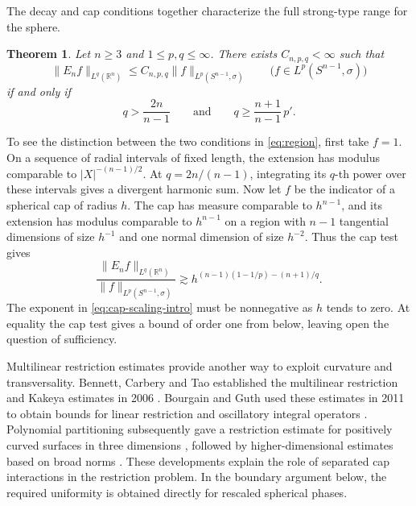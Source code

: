 \documentclass[11pt]{article}
\numberwithin{equation}{section}
\newtheorem{theorem}{Theorem}[section]
\newcommand{\R}{\mathbb{R}}
\newcommand{\norm}[1]{\lVert #1\rVert}
\newcommand{\abs}[1]{\lvert #1\rvert}
\begin{document}
The decay and cap conditions together characterize the full strong-type
range for the sphere.

\begin{theorem}\label{thm:main}
Let \(n\ge3\) and \(1\le p,q\le\infty\). There exists
\(C_{n,p,q}<\infty\) such that
\[
 \norm{E_n f}_{L^q(\R^n)}
 \le C_{n,p,q}\norm{f}_{L^p(S^{n-1},\sigma)}
 \qquad \bigl(f\in L^p(S^{n-1},\sigma)\bigr)
\]
if and only if
\begin{equation}\label{eq:region}
 q>\frac{2n}{n-1}
 \qquad\text{and}\qquad
 q\geq\frac{n+1}{n-1}\,p'.
\end{equation}
\end{theorem}

To see the distinction between the two conditions in
\eqref{eq:region}, first take \(f=1\). On a sequence of radial intervals of fixed length,
the extension has modulus comparable to
\(\abs X^{-(n-1)/2}\). At \(q=2n/(n-1)\), integrating its \(q\)-th
power over these intervals gives a divergent harmonic sum.
Now let \(f\) be the indicator of a spherical cap of radius \(h\).
The cap has measure comparable to \(h^{n-1}\), and its extension has
modulus comparable to \(h^{n-1}\) on a region with \(n-1\) tangential
dimensions of size \(h^{-1}\) and one normal dimension of size
\(h^{-2}\). Thus the cap test gives
\begin{equation}\label{eq:cap-scaling-intro}
 \frac{\norm{E_n f}_{L^q(\R^n)}}{\norm{f}_{L^p(S^{n-1},\sigma)}}
 \gtrsim h^{(n-1)(1-1/p)-(n+1)/q}.
\end{equation}
The exponent in \eqref{eq:cap-scaling-intro} must be nonnegative as
\(h\) tends to zero. At equality the cap test gives a bound of order
one from below, leaving open the question of sufficiency.

Multilinear restriction estimates provide another way to exploit
curvature and transversality. Bennett, Carbery and Tao established the
multilinear restriction and Kakeya estimates in 2006 \cite{BCT}.
Bourgain and Guth used these estimates in 2011 to obtain bounds for
linear restriction and oscillatory integral operators \cite{BG}.
Polynomial partitioning subsequently gave a restriction estimate for
positively curved surfaces in three dimensions \cite{guth2016}, followed
by higher-dimensional estimates based on broad norms \cite{guth2018}.
These developments explain the role of separated cap interactions in
the restriction problem. In the boundary argument below, the required
uniformity is obtained directly for rescaled spherical phases.
\end{document}
